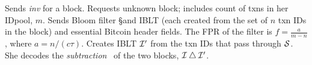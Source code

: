 
{ 
\begin{myprot}{\textbf{\Mf}}
\label{protocol:pblt}
\STATE \sender Sends \textit{inv} for a block.
%
\STATE \recvr \hspace{-.1mm}Requests unknown block; includes count of txns in her IDpool, $m$.
\STATE \sender  Sends Bloom filter \S and IBLT \I (each created from the set of $n$ txn IDs in the block) and essential Bitcoin header fields.  The FPR of the filter is $f=\frac{a}{m-n}$, where $a=n/(c\tau)$.%
%
\STATE \recvr Creates IBLT $\cal{I}'$ from the txn IDs that pass through $\cal{S}$. She decodes the {\em subtraction}~\cite{eppstein:2011} of the two blocks, $\cal{I} \bigtriangleup \cal{I'}$.\end{myprot}
}
